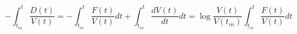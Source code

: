 \begin{equation}
-\int_{t_{in}}^t \frac{D(t)}{V(t)}=-\int_{t_{in}}^t \frac{F(t)}{V(t)} dt + \int_{t_{in}}^t \frac{dV(t)}{dt} dt = \log \frac{V(t)}{V(t_{in})} \int_{t_{in}}^t \frac{F(t)}{V(t)} dt
\end{equation}